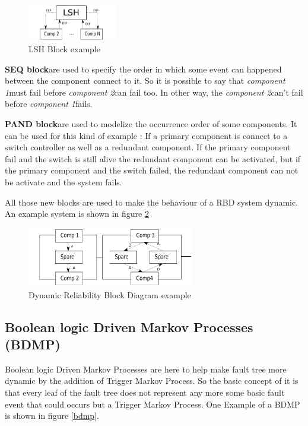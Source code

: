 \begin{figure}[h]
    \centering
	\includegraphics[width=0.35\textwidth]{schema/lsh.pdf}
    \caption{LSH Block example}
    \label{lsh}
\end{figure}


\textbf{SEQ block}are used to specify the order in which some event can
happened between the component connect to it. So it is possible to say
that \emph{component 1}must fail before \emph{component 2}can fail too. In
other way, the \emph{component 2}can't fail before \emph{component 1}fails.

\textbf{PAND block}are used to modelize the occurrence order of some
components. It can be used for this kind of example : If a primary
component is connect to a switch controller as well as a redundant
component. If the primary component fail and the switch is still alive
the redundant component can be activated, but if the primary component
and the switch failed, the redundant component can not be activate and
the system fails.

All those new blocks are used to make the behaviour of a RBD system
dynamic. An example system is shown in figure \ref{DRBD}

\begin{figure}[h]
    \centering
	\includegraphics[width=0.65\textwidth]{schema/drbd.pdf}
    \caption{Dynamic Reliability Block Diagram example}
    \label{DRBD}
\end{figure}

\subsection{Boolean logic Driven Markov Processes (BDMP)}

Boolean logic Driven Markov Processes are here to help make fault tree
more dynamic by the addition of Trigger Markov Process. So the basic
concept of it is that every leaf of the fault tree does not represent
any more some basic fault event that could occurs but a Trigger Markov
Process. One Example of a BDMP is shown in figure \ref{bdmp}.

